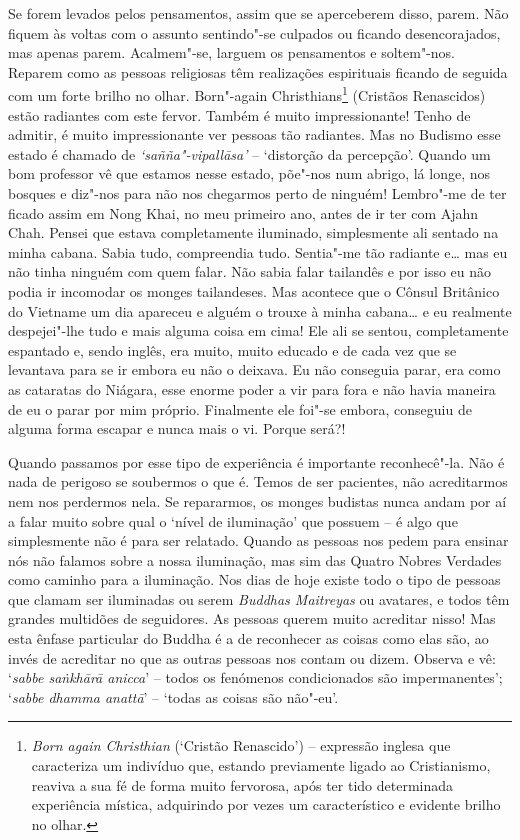 Se forem levados pelos pensamentos, assim que se aperceberem disso,
parem. Não fiquem às voltas com o assunto sentindo"-se culpados ou
ficando desencorajados, mas apenas parem. Acalmem"-se, larguem os
pensamentos e soltem"-nos. Reparem como as pessoas religiosas têm
realizações espirituais ficando de seguida com um forte brilho no olhar.
Born"-again Christhians\footnote{%
  \emph{Born again Christhian} (`Cristão Renascido') -- expressão
  inglesa que caracteriza um indivíduo que, estando previamente ligado ao
  Cristianismo, reaviva a sua fé de forma muito fervorosa, após ter tido
  determinada experiência mística, adquirindo por vezes um característico
  e evidente brilho no olhar.}
(Cristãos Renascidos) estão radiantes com este
fervor. Também é muito impressionante! Tenho de admitir, é muito
impressionante ver pessoas tão radiantes. Mas no Budismo esse estado é
chamado de \emph{`sañña"-vipallāsa'} -- `distorção da percepção'. Quando um
bom professor vê que estamos nesse estado, põe"-nos num abrigo, lá longe,
nos bosques e diz"-nos para não nos chegarmos perto de ninguém! Lembro"-me
de ter ficado assim em Nong Khai, no meu primeiro ano, antes de ir ter
com Ajahn Chah. Pensei que estava completamente iluminado, simplesmente
ali sentado na minha cabana. Sabia tudo, compreendia tudo. Sentia"-me
tão radiante e\ldots{} mas eu não tinha ninguém com quem falar. 
Não sabia falar tailandês e por isso eu não podia ir incomodar os
monges tailandeses. Mas acontece que o Cônsul Britânico do Vietname um
dia apareceu e alguém o trouxe à minha cabana\ldots{} e eu realmente
despejei"-lhe tudo e mais alguma coisa em cima! Ele ali se sentou,
completamente espantado e, sendo inglês, era muito, muito educado e de
cada vez que se levantava para se ir embora eu não o deixava. Eu não
conseguia parar, era como as cataratas do Niágara, esse enorme poder a
vir para fora e não havia maneira de eu o parar por mim próprio.
Finalmente ele foi"-se embora, conseguiu de alguma forma escapar e nunca
mais o vi. Porque será?!

Quando passamos por esse tipo de experiência é importante reconhecê"-la.
Não é nada de perigoso se soubermos o que é. Temos de ser pacientes, não
acreditarmos nem nos perdermos nela. Se repararmos, os monges
budistas nunca andam por aí a falar muito sobre qual o `nível de
iluminação' que possuem -- é
algo que simplesmente não é para ser relatado. Quando as pessoas nos
pedem para ensinar nós não falamos sobre a nossa iluminação, mas sim das
Quatro Nobres Verdades como caminho para a iluminação. Nos dias de hoje
existe todo o tipo de pessoas que clamam ser iluminadas ou serem
\emph{Buddhas Maitreyas} ou avatares, e todos têm grandes multidões de
seguidores. As pessoas querem muito acreditar nisso! Mas esta ênfase
particular do Buddha é a de reconhecer as coisas como elas são, ao invés
de acreditar no que as outras pessoas nos contam ou dizem. Observa e vê:
`\emph{sabbe saṅkhārā anicca}' -- todos os fenómenos condicionados são
impermanentes'; `\emph{sabbe dhamma anattā}' -- `todas as coisas são
não"-eu'.

